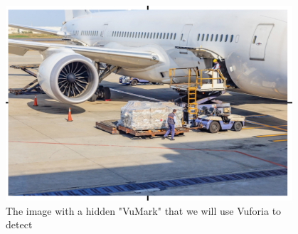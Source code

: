 \begin{figure}[htp]
\centering
\includegraphics[width=0.95\textwidth, angle=0]{Meetings/January/01-19-22/1.19.21 airplane picture - James Hu.PNG}
\caption{The image with a hidden "VuMark" that we will use Vuforia to detect}
\label{fig:012922_1}
\end{figure}


